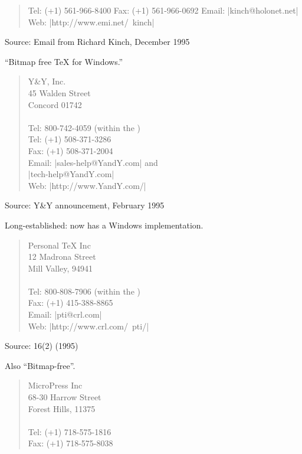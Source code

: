 \begin{description}
\begin{quote}
    Tel: (+1) 561-966-8400
    Fax: (+1) 561-966-0692
    Email: \Email|kinch@holonet.net|\\
    Web: \URL|http://www.emi.net/~kinch|
  \end{quote}
  Source: Email from Richard Kinch, December 1995
\item[\acro{PC}; \TeX{}] ``Bitmap free \TeX{} for Windows.''
  \begin{quote}
    Y\&Y, Inc.\\
    45 Walden Street\\
    Concord  01742\\
    \\[.25\baselineskip]
    Tel: 800-742-4059 (within the )\\
    Tel: (+1) 508-371-3286\\
    Fax: (+1) 508-371-2004\\
    Email: \Email|sales-help@YandY.com| and
    \htmlignore
    \\ \hphantom{Email: }%
    \endhtmlignore
    \Email|tech-help@YandY.com|\\
    Web: \URL|http://www.YandY.com/|
  \end{quote}
  Source: Y\&Y announcement, February 1995
\item[pc\TeX{}] Long-established: now has a Windows implementation.
  \begin{quote}
    Personal \TeX{} Inc\\
    12 Madrona Street\\
    Mill Valley,  94941\\
    \\[.25\baselineskip]
    Tel: 800-808-7906 (within the )\\
    Fax: (+1) 415-388-8865\\
    Email: \Email|pti@crl.com|\\
    Web: \URL|http://www.crl.com/~pti/|
  \end{quote}
  Source: \TUGboat{} 16(2) (1995)
\item[\acro{PC}; V\TeX{}] Also ``Bitmap-free''.
  \begin{quote}
    MicroPress Inc\\
    68-30 Harrow Street\\
    Forest Hills,  11375\\
    \\[.25\baselineskip]
    Tel: (+1) 718-575-1816\\
    Fax: (+1) 718-575-8038\\

\end{quote}
\end{description}
